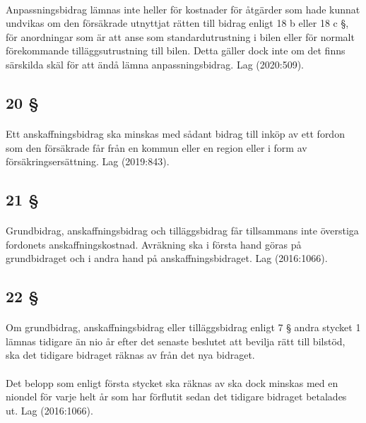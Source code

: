 \documentclass[a4paper,notitlepage,openany,10pt]{book}
\begin{document}
\paragraph*{}
Anpassningsbidrag lämnas inte heller för kostnader för åtgärder som hade kunnat undvikas om den försäkrade utnyttjat rätten till bidrag enligt 18 b eller 18 c §, för anordningar som är att anse som standardutrustning i bilen eller för normalt förekommande tilläggsutrustning till bilen. Detta gäller dock inte om det finns särskilda skäl för att ändå lämna anpassningsbidrag.
Lag (2020:509).
\subsection*{20 §}
\paragraph*{}
Ett anskaffningsbidrag ska minskas med sådant bidrag till inköp av ett fordon som den försäkrade får från en kommun eller en region eller i form av försäkringsersättning.
Lag (2019:843).
\subsection*{21 §}
\paragraph*{}
Grundbidrag, anskaffningsbidrag och tilläggsbidrag får tillsammans inte överstiga fordonets anskaffningskostnad. Avräkning ska i första hand göras på grundbidraget och i andra hand på anskaffningsbidraget.
Lag (2016:1066).
\subsection*{22 §}
\paragraph*{}
Om grundbidrag, anskaffningsbidrag eller tilläggsbidrag enligt 7 § andra stycket 1 lämnas tidigare än nio år efter det senaste beslutet att bevilja rätt till bilstöd, ska det tidigare bidraget räknas av från det nya bidraget.
\paragraph*{}
Det belopp som enligt första stycket ska räknas av ska dock minskas med en niondel för varje helt år som har förflutit sedan det tidigare bidraget betalades ut.
Lag (2016:1066).
\end{document}
